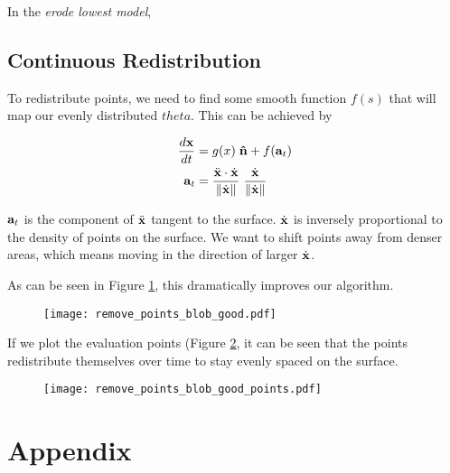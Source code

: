 In the \textit{erode lowest model}, 

\subsection*{Continuous Redistribution}

To redistribute points, we need to find some smooth function $f(s)$ that will map our evenly distributed $theta$. This can be achieved by 

\begin{align}
  \frac{d\bvec{x}}{dt}& = g(x) \; \bhat{n} + f(\bvec{a}_t)\\
  \bvec{a}_t& = \frac{\ddot{\bvec{x}} \cdot \dot{\bvec{x}}}{\norm{\dot{\bvec{x}}}} \; \frac{\dot{\bvec{x}}}{\norm{\dot{\bvec{x}}}}
\end{align}

$\mathbf{a}_t$ is the component of $\ddot{\mathbf{x}}$ tangent to the surface. $\dot{\mathbf{x}}$ is inversely proportional to the density of points on the surface. We want to shift points away from denser areas, which means moving in the direction of larger $\dot{\mathbf{x}}$.

As can be seen in Figure \ref{fig:remove-points-blob-good}, this dramatically improves our algorithm.

\begin{figure}[H]
    \begin{center}
      \texttt{[image: remove\_points\_blob\_good.pdf]}
    \end{center}
  \vspace{-.2in} %
  \caption{\label{fig:remove-points-blob-good}}
\end{figure}

If we plot the evaluation points (Figure \ref{fig:remove-points-blob-good-points}, it can be seen that the points redistribute themselves over time to stay evenly spaced on the surface.

\begin{figure}[H]
    \begin{center}
      \texttt{[image: remove\_points\_blob\_good\_points.pdf]}
    \end{center}
  \vspace{-.2in} %
  \caption{\label{fig:remove-points-blob-good-points}}
\end{figure}


\section*{Appendix}

